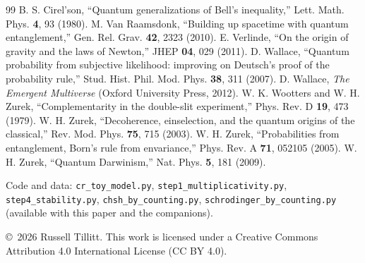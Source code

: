 \documentclass[11pt]{article}
\theoremstyle{definition}
\theoremstyle{remark}
\begin{document}
\begin{thebibliography}{99}
 B. S. Cirel'son, ``Quantum generalizations of Bell's inequality,'' Lett. Math. Phys. \textbf{4}, 93 (1980).
 M. Van Raamsdonk, ``Building up spacetime with quantum entanglement,'' Gen. Rel. Grav. \textbf{42}, 2323 (2010).
 E. Verlinde, ``On the origin of gravity and the laws of Newton,'' JHEP \textbf{04}, 029 (2011).
 D. Wallace, ``Quantum probability from subjective likelihood: improving on Deutsch's proof of the probability rule,'' Stud. Hist. Phil. Mod. Phys. \textbf{38}, 311 (2007).
 D. Wallace, \emph{The Emergent Multiverse} (Oxford University Press, 2012).
 W. K. Wootters and W. H. Zurek, ``Complementarity in the double-slit experiment,'' Phys. Rev. D \textbf{19}, 473 (1979).
 W. H. Zurek, ``Decoherence, einselection, and the quantum origins of the classical,'' Rev. Mod. Phys. \textbf{75}, 715 (2003).
 W. H. Zurek, ``Probabilities from entanglement, Born's rule from envariance,'' Phys. Rev. A \textbf{71}, 052105 (2005).
 W. H. Zurek, ``Quantum Darwinism,'' Nat. Phys. \textbf{5}, 181 (2009).
\end{thebibliography}

\vspace{1em}
\noindent\small Code and data: \texttt{cr\_toy\_model.py}, \texttt{step1\_multiplicativity.py}, \texttt{step4\_stability.py}, \texttt{chsh\_by\_counting.py}, \texttt{schrodinger\_by\_counting.py} (available with this paper and the companions).

\smallskip
\noindent\small \copyright\ 2026 Russell Tillitt. This work is licensed under a Creative Commons Attribution 4.0 International License (CC BY 4.0).
\end{document}
